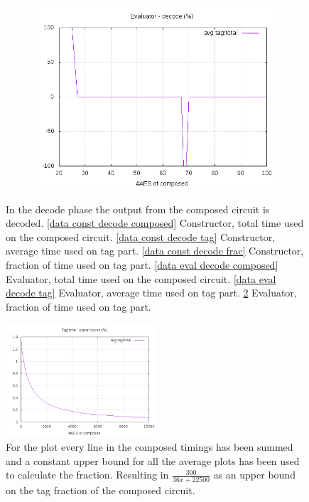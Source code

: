 \documentclass[10pt,a4paper]{article}
\begin{document}
\begin{figure}[h]
\begin{subfigure}[t]{0.3\textwidth}
        \includegraphics[width=\textwidth]{eval_decode_frac}
        \caption{}
        \label{data eval decode frac}
    \end{subfigure}
    \caption{In the decode phase the output from the composed circuit is decoded. \ref{data const decode composed} Constructor, total time used on the composed circuit. \ref{data const decode tag} Constructor, average time used on tag part. \ref{data const decode frac} Constructor, fraction of time used on tag part. \ref{data eval decode composed} Evaluator,  total time used on the composed circuit. \ref{data eval decode tag} Evaluator, average time used on tag part. \ref{data eval decode frac} Evaluator, fraction of time used on tag part.}
\end{figure}

\begin{figure}[h]
    \centering
    \includegraphics[width=0.5\textwidth]{total_frac}
    \caption{For the plot every line in the composed timings has been summed and a constant upper bound for all the average plots has been used to calculate the fraction. Resulting in $\frac{300}{36x+22500}$ as an upper bound on the tag fraction of the composed circuit.}
    \label{data total}
\end{figure}
\end{document}
